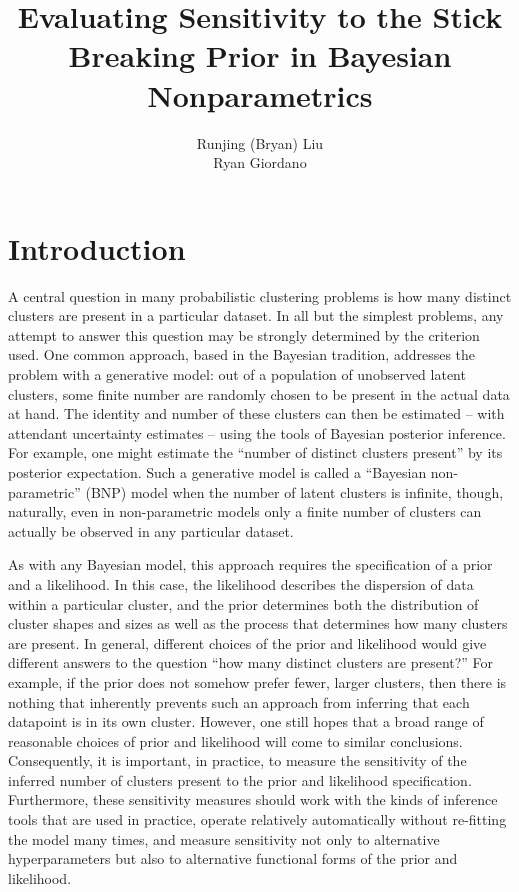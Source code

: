 \documentclass{article}
\title{Evaluating Sensitivity to the Stick Breaking Prior in Bayesian Nonparametrics}
\author{
    Runjing (Bryan) Liu\\
    \And
    Ryan Giordano
}
\begin{document}
\maketitle

\section{Introduction}
%
A central question in many probabilistic clustering problems is how many
distinct clusters are present in a particular dataset. In all but the simplest
problems, any attempt to answer this question may be strongly determined by the
criterion used. One common approach, based in the Bayesian tradition, addresses
the problem with a generative model: out of a population of unobserved latent
clusters, some finite number are randomly chosen to be present in the actual
data at hand. The identity and number of these clusters can then be estimated –
with attendant uncertainty estimates – using the tools of Bayesian posterior
inference. For example, one might estimate the “number of distinct clusters
present” by its posterior expectation. Such a generative model is called a
“Bayesian non-parametric” (BNP) model when the number of latent clusters is
infinite, though, naturally, even in non-parametric models only a finite number
of clusters can actually be observed in any particular dataset.

As with any Bayesian model, this approach requires the specification of a prior
and a likelihood. In this case, the likelihood describes the dispersion of data
within a particular cluster, and the prior determines both the distribution of
cluster shapes and sizes as well as the process that determines how many
clusters are present. In general, different choices of the prior and likelihood
would give different answers to the question “how many distinct clusters are
present?” For example, if the prior does not somehow prefer fewer, larger
clusters, then there is nothing that inherently prevents such an approach from
inferring that each datapoint is in its own cluster. However, one still hopes
that a broad range of reasonable choices of prior and likelihood will come to
similar conclusions. Consequently, it is important, in practice, to measure the
sensitivity of the inferred number of clusters present to the prior and
likelihood specification. Furthermore, these sensitivity measures should work
with the kinds of inference tools that are used in practice, operate relatively
automatically without re-fitting the model many times, and measure sensitivity
not only to alternative hyperparameters but also to alternative functional forms
of the prior and likelihood.
\end{document}
